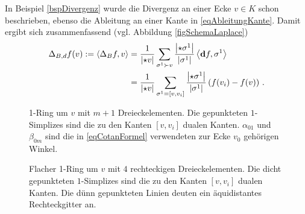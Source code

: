     In Beispiel \ref{bspDivergenz} wurde die Divergenz an einer Ecke \( v\in K \) schon beschrieben, ebenso die Ableitung an einer Kante in \eqref{eqAbleitungKante}.
    Damit ergibt sich zusammenfassend (vgl. Abbildung \ref{figSchemaLaplace})\\
    \begin{align}
    \label{eqDiskreteLaplace}
    \begin{aligned}
      \Delta_{B,d} f(v) :=
      \left\langle \Delta_{B} f, v \right\rangle 
          &= \frac{1}{\left| \star v \right|} \sum_{\sigma^{1}\succ v} \frac{\left| \star\sigma^{1} \right|}{\left| \sigma^{1} \right|}
                       \left\langle \mathbf{d} f , \sigma^{1} \right\rangle \\
          &= \frac{1}{\left| \star v \right|} \sum_{\sigma^{1}=\left[ v,v_{i} \right]} \frac{\left| \star\sigma^{1} \right|}{\left| \sigma^{1} \right|}
                       \left( f(v_{i}) - f(v) \right) \,\text{.}
    \end{aligned}
    \end{align}

    \begin{figure}
      \begin{minipage}[t]{0.45\textwidth}
        \centering
        \caption[Schema für Laplace]{1-Ring um \( v \) mit \( m+1 \) Dreieckelementen.
                                     Die gepunkteten \( 1 \)-Simplizes sind die zu den Kanten 
                                     \( \left[ v, v_{i} \right] \) dualen Kanten.
                                     \( \alpha_{01} \) und \( \beta_{0m} \) sind die in \eqref{eqCotanFormel} verwendeten zur Ecke \( v_{0} \) gehörigen Winkel.}
        \label{figSchemaLaplace}
      \end{minipage}
      \hfill
      \begin{minipage}[t]{0.45\textwidth}
        \centering
        \caption[5-Punkte-Stern]{Flacher 1-Ring um \( v \) mit \( 4 \) rechteckigen Dreieckelementen.
                                     Die dicht gepunkteten \( 1 \)-Simplizes sind die zu den Kanten 
                                     \( \left[ v, v_{i} \right] \) dualen Kanten.
                                     Die dünn gepunkteten Linien deuten ein äquidistantes Rechteckgitter an.}
        \label{fig5PunktStern}
      \end{minipage}
    \end{figure}

